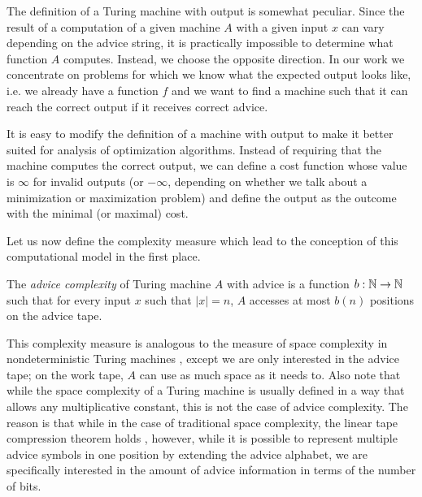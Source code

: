 The definition of a Turing machine with output is somewhat peculiar. Since
the result of a computation of a given machine $A$ with a given input $x$
can vary depending on the advice string, it is practically impossible to
determine what function $A$ computes. Instead, we choose the opposite
direction. In our work we concentrate on problems for which we know what
the expected output looks like, i.e. we already have a function $f$ and we
want to find a machine such that it can reach the correct output if it
receives correct advice.

It is easy to modify the definition of a machine with output to make it
better suited for analysis of optimization algorithms. Instead of
requiring that the machine computes the correct output, we can define a
cost function whose value is $\infty$ for invalid outputs (or $-\infty$,
depending on whether we talk about a minimization or maximization problem)
and define the output as the outcome with the minimal (or maximal) cost.

Let us now define the complexity measure which lead to the conception of
this computational model in the first place.

\begin{definition}\label{definition:offline-advice-complexity}
    The \emph{advice complexity} of Turing machine $A$ with advice is a
    function $b: \mathbb{N} \to \mathbb{N}$ such that for every input $x$ such that $|x| =
    n$, $A$ accesses at most $b(n)$ positions on the advice tape.
\end{definition}

This complexity measure is analogous to the measure of space complexity in
nondeterministic Turing machines \cite{nspace}, except we are only
interested in the advice tape; on the work tape, $A$ can use as much space
as it needs to. Also note that while the space complexity of a Turing
machine is usually defined in a way that allows any multiplicative
constant, this is not the case of advice complexity. The reason is that
while in the case of traditional space complexity, the linear tape
compression theorem holds \cite{tape-compression}, however, while it is
possible to represent multiple advice symbols in one position by extending
the advice alphabet, we are specifically interested in the amount of
advice information in terms of the number of bits.

